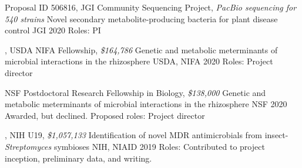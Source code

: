 

\begin{cventries}

\cventry
{Proposal ID 506816, JGI Community Sequencing Project, \textit{PacBio sequencing for 540 strains}}
{Novel secondary metabolite-producing bacteria for plant disease control}
{JGI}
{2020}
{Roles: PI}

\cventry
{\textbf{\textit{}}, USDA NIFA Fellowship, \textit{\$164,786}}
{Genetic and metabolic meterminants of microbial interactions in the rhizosphere}
{USDA, NIFA}
{2020}
{Roles: Project director}

\cventry
{NSF Postdoctoral Research Fellowship in Biology, \textit{\$138,000}}
{Genetic and metabolic meterminants of microbial interactions in the rhizosphere}
{NSF}
{2020}
{Awarded, but declined. Proposed roles: Project director}

\cventry
{\textbf{\textit{}}, NIH U19, \textit{\$1,057,133}}
{Identification of novel MDR antimicrobials from insect-\textit{Streptomyces} symbioses}
{NIH, NIAID}
{2019}
{Roles: Contributed to project inception, preliminary data, and writing.}

\end{cventries}